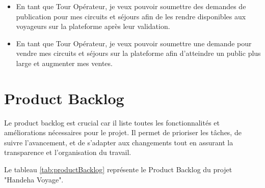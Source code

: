 \documentclass[12pt]{report}
\begin{document}
\begin{itemize}
					\item En tant que Tour Opérateur, je veux pouvoir soumettre des demandes de publication pour mes circuits et séjours afin de les rendre disponibles aux voyageurs sur la plateforme après leur validation.
					\item En tant que Tour Opérateur, je veux pouvoir soumettre une demande pour vendre mes circuits et séjours sur la plateforme afin d'atteindre un public plus large et augmenter mes ventes.
				\end{itemize}
				
				\section{Product Backlog}

				Le product backlog est crucial car il liste toutes les fonctionnalités et améliorations nécessaires pour le projet. Il permet de prioriser les tâches, de suivre l'avancement, et de s'adapter aux changements tout en assurant la transparence et l'organisation du travail.

				Le tableau \ref{tab:productBacklog} représente le Product Backlog du projet "Handeha Voyage".
\end{document}
